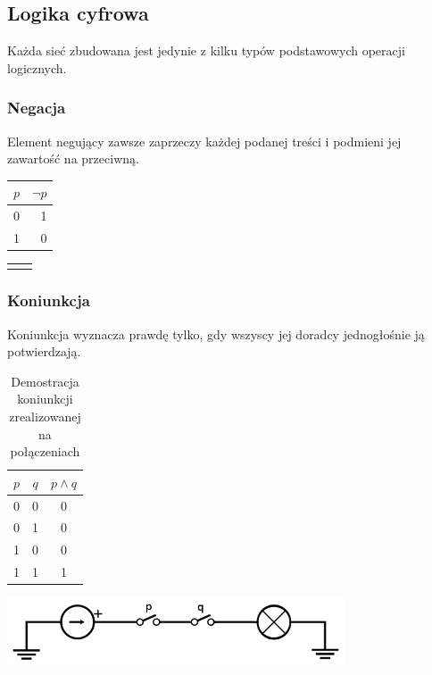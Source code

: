 \documentclass[a4paper,12pt]{article}
\begin{document}
\subsection{Logika cyfrowa}
Każda sieć zbudowana jest jedynie z kilku typów podstawowych operacji logicznych.

\subsubsection{Negacja}
Element negujący zawsze zaprzeczy każdej podanej treści i podmieni jej zawartość na przeciwną.

\begin{table}[h!]
\centering

\begin{minipage}{5.5cm}
\centering

\begin{tabular}{ | c || r | }
  \hline
  $p$ & $\lnot p$ \\ \hline
  0 & 1 \\
  1 & 0 \\
  \hline
\end{tabular}
\end{minipage}
\begin{minipage}{11cm}
\begin{tabular}{  c r }
  & \\
\end{tabular}
\end{minipage}
\end{table}

\subsubsection{Koniunkcja}

Koniunkcja wyznacza prawdę tylko, gdy wszyscy jej doradcy jednogłośnie ją potwierdzają.

\begin{table}[h!]
\centering

\begin{minipage}{5.5cm}
\centering

\begin{tabular}{ | c | c || c | }
  \hline
  $p$ & $q$ & $p \land q$ \\ \hline
  0 & 0 & 0 \\
  0 & 1 & 0 \\
  1 & 0 & 0 \\
  1 & 1 & 1 \\
  \hline
\end{tabular}
\end{minipage}
\begin{minipage}{11cm}
   \includegraphics[width=10cm]{grafika/obwody/circuit-and.png}
   \caption*{Demostracja koniunkcji zrealizowanej na połączeniach}
\end{minipage}
\end{table}
\end{document}

